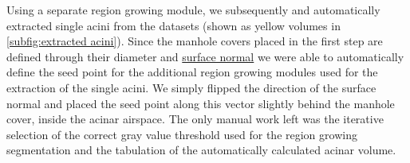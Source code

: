 \documentclass[%
	paper=a4,%
	abstract=true,%
	]{scrartcl}
\begin{document}
Using a separate region growing module, we subsequently and automatically extracted single acini from the datasets (shown as yellow volumes in \autoref{subfig:extracted acini}). Since the manhole covers placed in the first step are defined through their diameter and \href{https://secure.wikimedia.org/wikipedia/en/w/index.php?title=Surface_normal&oldid=411684319}{surface normal} we were able to automatically define the seed point for the additional region growing modules used for the extraction of the single acini. We simply flipped the direction of the surface normal and placed the seed point along this vector slightly behind the manhole cover, inside the acinar airspace. The only manual work left was the iterative selection of the correct gray value threshold used for the region growing segmentation and the tabulation of the automatically calculated acinar volume.
\end{document}

